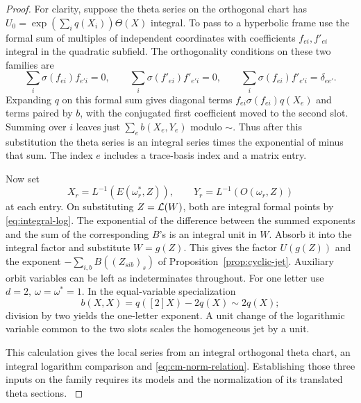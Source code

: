 \begin{proof}
For clarity, suppose the theta series on the orthogonal chart
has \(U_0=\exp(\sum_i q(X_i))\Theta(X)\) integral. To pass to
a hyperbolic frame use the formal sum of multiples of independent
coordinates with coefficients \(f_{ei},f'_{ei}\) integral in
the quadratic subfield. The orthogonality conditions on these two families are
\[
  \sum_i\sigma(f_{ei})f_{e'i}=0,\qquad\sum_i\sigma(f'_{ei})f'_{e'i}=0,\qquad\sum_i\sigma(f_{ei})f'_{e'i}=\delta_{ee'}.
\]
Expanding \(q\) on this formal sum gives diagonal terms
\(f_{ei}\sigma(f_{ei})q(X_e)\) and terms paired by \(b\),
with the conjugated first coefficient moved to the second slot.
Summing over \(i\) leaves just \(\sum_e b(X_e,Y_e)\) modulo
\(\sim\). Thus after this substitution the theta series is an
integral series times the exponential of minus that sum.
The index \(e\) includes a trace-basis index and a matrix
entry.

Now set
\[
  X_r=L^{-1}(E(\omega_r^*,Z)),\qquad
  Y_r=L^{-1}(O(\omega_r,Z))
\]
at each entry. On substituting \(Z={\cal L}(W)\), both are
integral formal points by \eqref{eq:integral-log}. The
exponential of the difference between the summed exponents
and the sum of the corresponding \(B\)'s is an integral unit
in \(W\). Absorb it into the integral factor and substitute
\(W=g(Z)\). This gives the factor \(U(g(Z))\) and the exponent
\(-\sum_{i,b} B((Z_{sib})_s)\) of
Proposition~\ref{prop:cyclic-jet}. Auxiliary orbit variables
can be left as indeterminates throughout. For one letter use
\(d=2,\ \omega=\omega^*=1\). In the equal-variable
specialization 
\[
  b(X,X)=q([2]X)-2q(X)\sim 2q(X);
\]
 division by two yields
the one-letter exponent. A unit change of the logarithmic
variable common to the two slots scales the homogeneous jet by
a unit.

This calculation gives the local series from an integral
orthogonal theta chart, an integral logarithm comparison and
\eqref{eq:cm-norm-relation}. Establishing those three inputs
on the family requires its models and the normalization of its
translated theta sections.
\label{cor:curve-exponents-1}
\end{proof}
